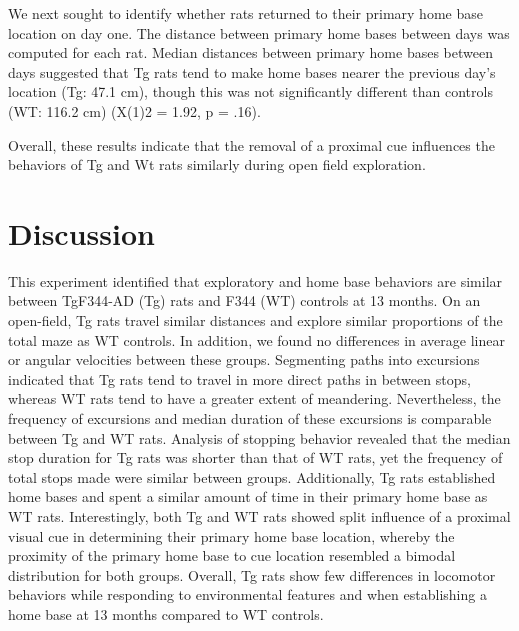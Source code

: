 \documentclass[fleqn,10pt]{wlscirep}
\begin{document}
We next sought to identify whether rats returned to their primary home base location on day one. The distance between primary home bases between days was computed for each rat. Median distances between primary home bases between days suggested that Tg rats tend to make home bases nearer the previous day’s location (Tg: 47.1 cm), though this was not significantly different than controls (WT: 116.2 cm) (X(1)2 = 1.92, p = .16). 

Overall, these results indicate that the removal of a proximal cue influences the behaviors of Tg and Wt rats similarly during open field exploration. 

\section*{Discussion}

This experiment identified that exploratory and home base behaviors are similar between TgF344-AD (Tg) rats and F344 (WT) controls at 13 months. On an open-field, Tg rats travel similar distances and explore similar proportions of the total maze as WT controls. In addition, we found no differences in average linear or angular velocities between these groups. Segmenting paths into excursions indicated that Tg rats tend to travel in more direct paths in between stops, whereas WT rats tend to have a greater extent of meandering. Nevertheless, the frequency of excursions and median duration of these excursions is comparable between Tg and WT rats. Analysis of stopping behavior revealed that the median stop duration for Tg rats was shorter than that of WT rats, yet the frequency of total stops made were similar between groups. Additionally, Tg rats established home bases and spent a similar amount of time in their primary home base as WT rats. Interestingly, both Tg and WT rats showed split influence of a proximal visual cue in determining their primary home base location, whereby the proximity of the primary home base to cue location resembled a bimodal distribution for both groups. Overall, Tg rats show few differences in locomotor behaviors while responding to environmental features and when establishing a home base at 13 months compared to WT controls. 
\end{document}
